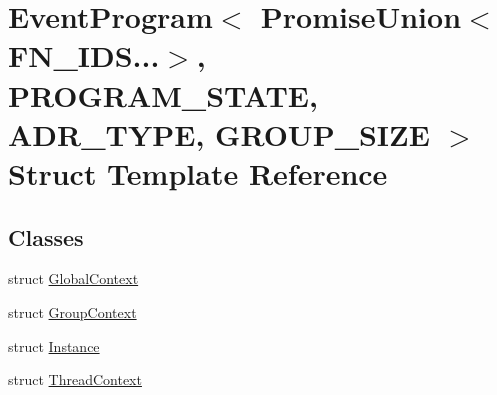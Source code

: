 \hypertarget{structEventProgram_3_01PromiseUnion_3_01FN__IDS_8_8_8_4_00	PROGRAM__STATE_00	ADR__TYPE_00	GROUP__SIZE_01_4}{\section{Event\-Program$<$ Promise\-Union$<$ F\-N\-\_\-\-I\-D\-S...$>$, P\-R\-O\-G\-R\-A\-M\-\_\-\-S\-T\-A\-T\-E, A\-D\-R\-\_\-\-T\-Y\-P\-E, G\-R\-O\-U\-P\-\_\-\-S\-I\-Z\-E $>$ Struct Template Reference}
\label{structEventProgram_3_01PromiseUnion_3_01FN__IDS_8_8_8_4_00	PROGRAM__STATE_00	ADR__TYPE_00	GROUP__SIZE_01_4}
}
\subsection*{Classes}
\begin{DoxyCompactItemize}
\item 
struct \hyperlink{structEventProgram_3_01PromiseUnion_3_01FN__IDS_8_8_8_4_00	PROGRAM__STATE_00	ADR__TYPE_00	GROUP__SIZE_01_4_1_1GlobalContext}{Global\-Context}
\item 
struct \hyperlink{structEventProgram_3_01PromiseUnion_3_01FN__IDS_8_8_8_4_00	PROGRAM__STATE_00	ADR__TYPE_00	GROUP__SIZE_01_4_1_1GroupContext}{Group\-Context}
\item 
struct \hyperlink{structEventProgram_3_01PromiseUnion_3_01FN__IDS_8_8_8_4_00	PROGRAM__STATE_00	ADR__TYPE_00	GROUP__SIZE_01_4_1_1Instance}{Instance}
\item 
struct \hyperlink{structEventProgram_3_01PromiseUnion_3_01FN__IDS_8_8_8_4_00	PROGRAM__STATE_00	ADR__TYPE_00	GROUP__SIZE_01_4_1_1ThreadContext}{Thread\-Context}
\end{DoxyCompactItemize}
